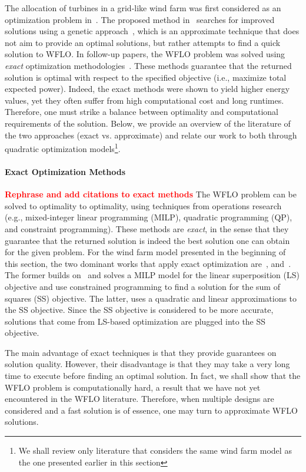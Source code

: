 \documentclass[preprint,12pt]{elsarticle}
\newcommand{\todo}[1]{{\textcolor{red}{\bf {#1}}}}
\begin{document}
The allocation of turbines in a grid-like wind farm was first considered 
as an optimization problem in~\cite{MOSETTI1994105}. The proposed method in~\cite{MOSETTI1994105}
searches for improved solutions using a 
genetic approach~\cite{davis1991handbook},
which is an approximate technique 
that does not aim to provide an optimal solutions,
but rather attempts to find a quick solution to WFLO. 
In follow-up papers, 
the WFLO problem was solved using \emph{exact}  
optimization methodologies~\cite{turner2014new,Zhang2014}. 
These methods guarantee that the returned solution is optimal with respect
to the specified objective (i.e., maximize total expected power). 
Indeed, the exact methods were shown to yield higher energy values, yet they often suffer from 
high computational cost and long runtimes. Therefore, one must strike a balance between optimality and computational requirements of the solution.  
Below, we provide an overview of the literature of the two approaches (exact vs. approximate) and relate our 
work to both through quadratic optimization models\footnote{We shall review 
only literature that considers the same wind farm model as the one presented earlier in this section}. 
 
\paragraph{Exact Optimization Methods} 
\todo{Rephrase and add citations to exact methods}
The WFLO problem can be solved to optimality 
to optimality, using
techniques from operations research (e.g., mixed-integer linear programming (MILP), quadratic programming (QP), and constraint programming).
These methods are \emph{exact}, in the sense that they guarantee that the returned solution is indeed
the best solution one can obtain for the given problem. For the wind farm model
presented in the beginning of this section,
the two dominant works that apply exact optimization 
are~\cite{Zhang2014}, and~\cite{turner2014new}. 
The former builds on~\cite{donovan2005wind} and solves a MILP model for the linear superposition (LS) objective
and use constrained programming to find a solution for the sum of squares (SS) objective. The latter, uses a quadratic and linear approximations to the SS objective. Since the SS objective is considered to be more accurate, solutions that come from LS-based optimization 
are plugged into the SS objective.

The main advantage of exact techniques
is that they provide guarantees on solution quality. However, their disadvantage is
that they may take a very long time to execute before finding an optimal solution. 
In fact, we shall show that the WFLO problem is computationally hard, a result
that we have not yet encountered in the WFLO literature. Therefore,
when multiple designs are considered and a fast solution is of essence,
one may turn to approximate WFLO solutions.
\end{document}
